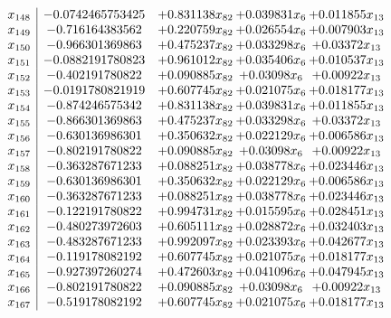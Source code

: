 \documentclass[11pt]{article}
\begin{document}
\[\begin{array}{c| c c@{\hskip 2pt} c@{\hskip 2pt} c@{\hskip 2pt} }
 x_{148}   &  -0.0742465753425 & + 0.831138 x_{82} & + 0.039831 x_{6} & + 0.011855 x_{13}\\
 x_{149}   &  -0.716164383562 & + 0.220759 x_{82} & + 0.026554 x_{6} & + 0.007903 x_{13}\\
 x_{150}   &  -0.966301369863 & + 0.475237 x_{82} & + 0.033298 x_{6} & + 0.03372 x_{13}\\
 x_{151}   &  -0.0882191780823 & + 0.961012 x_{82} & + 0.035406 x_{6} & + 0.010537 x_{13}\\
 x_{152}   &  -0.402191780822 & + 0.090885 x_{82} & + 0.03098 x_{6} & + 0.00922 x_{13}\\
 x_{153}   &  -0.0191780821919 & + 0.607745 x_{82} & + 0.021075 x_{6} & + 0.018177 x_{13}\\
 x_{154}   &  -0.874246575342 & + 0.831138 x_{82} & + 0.039831 x_{6} & + 0.011855 x_{13}\\
 x_{155}   &  -0.866301369863 & + 0.475237 x_{82} & + 0.033298 x_{6} & + 0.03372 x_{13}\\
 x_{156}   &  -0.630136986301 & + 0.350632 x_{82} & + 0.022129 x_{6} & + 0.006586 x_{13}\\
 x_{157}   &  -0.802191780822 & + 0.090885 x_{82} & + 0.03098 x_{6} & + 0.00922 x_{13}\\
 x_{158}   &  -0.363287671233 & + 0.088251 x_{82} & + 0.038778 x_{6} & + 0.023446 x_{13}\\
 x_{159}   &  -0.630136986301 & + 0.350632 x_{82} & + 0.022129 x_{6} & + 0.006586 x_{13}\\
 x_{160}   &  -0.363287671233 & + 0.088251 x_{82} & + 0.038778 x_{6} & + 0.023446 x_{13}\\
 x_{161}   &  -0.122191780822 & + 0.994731 x_{82} & + 0.015595 x_{6} & + 0.028451 x_{13}\\
 x_{162}   &  -0.480273972603 & + 0.605111 x_{82} & + 0.028872 x_{6} & + 0.032403 x_{13}\\
 x_{163}   &  -0.483287671233 & + 0.992097 x_{82} & + 0.023393 x_{6} & + 0.042677 x_{13}\\
 x_{164}   &  -0.119178082192 & + 0.607745 x_{82} & + 0.021075 x_{6} & + 0.018177 x_{13}\\
 x_{165}   &  -0.927397260274 & + 0.472603 x_{82} & + 0.041096 x_{6} & + 0.047945 x_{13}\\
 x_{166}   &  -0.802191780822 & + 0.090885 x_{82} & + 0.03098 x_{6} & + 0.00922 x_{13}\\
 x_{167}   &  -0.519178082192 & + 0.607745 x_{82} & + 0.021075 x_{6} & + 0.018177 x_{13}\\

\end{array}\]
\end{document}
